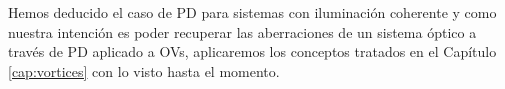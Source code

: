 
%




Hemos deducido el caso de PD para sistemas con iluminación coherente y como nuestra intención es poder recuperar las aberraciones de un sistema óptico a través de PD aplicado a OVs, aplicaremos los conceptos tratados en el Capítulo \ref{cap:vortices} con lo visto hasta el momento. \\


